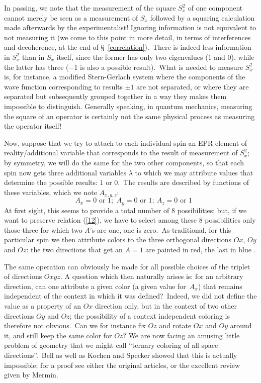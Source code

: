 \documentclass[12pt,onecolumn]{article}%
\begin{document}
In passing, we note that the measurement of the square $S_{x}^{2}$ of one
component cannot merely be seen as a measurement of $S_{x}$ followed by a
squaring calculation made afterwards by the experimentalist! Ignoring
information is not equivalent to not measuring it (we come to this point in
more detail, in terms of interferences and decoherence, at the end of
\S \ \ref{correlation}).\ There is indeed less information in $S_{x}^{2}$ than
in $S_{x}$ itself, since the former has only two eigenvalues ($1$ and $0$),
while the latter has three ($-1$ is also a possible result).\ What is needed
to measure $S_{x}^{2}$ is, for instance, a modified Stern-Gerlach system where
the components of the wave function corresponding to results $\pm1$ are not
separated, or where they are separated but subsequently grouped together in a
way they makes them impossible to distinguish. Generally speaking, in quantum
mechanics, measuring the square of an operator is certainly not the same
physical process as measuring the operator itself!

Now, suppose that we try to attach to each individual spin an EPR element of
reality/additional variable that corresponds to the result of measurement of
$S_{x}^{2}$; by symmetry, we will do the same for the two other components, so
that each spin now gets three additional variables $\lambda$ to which we may
attribute values that determine the possible results: $1$ or $0$.\ The results
are described by functions of these variables, which we note $A_{x,y,z}$:%
\begin{equation}
\text{ \ }\,A_{x}=0\text{\ or }1\text{;\ }\,A_{y}=0\text{\ or }1\text{;}%
\,\ A_{z}=0\text{\ or }1 \label{13}%
\end{equation}
At first sight, this seems to provide a total number of 8 possibilities; but,
if we want to preserve relation (\ref{12}), we have to select among these 8
possibilities only those three for which two $A$'s are one, one is zero.\ As
traditional, for this particular spin we then attribute colors to the three
orthogonal directions $Ox$, $Oy$ and $Oz$: the two directions that get an
$A=1$ are painted in red, the last in blue \cite{Belifante}.

The same operation can obviously be made for all possible choices of the
triplet of directions $Oxyz$. A question which then naturally arises is: for
an arbitrary direction, can one attribute a given color (a given value for
$\,A_{x}$) that remains independent of the context in which it was
defined?\ Indeed, we did not define the value as a property of an $Ox$
direction only, but in the context of two other directions $Oy$ and $Oz$; the
possibility of a context independent coloring is therefore not obvious.\ Can
we for instance fix $Oz$ and rotate $Ox$ and $Oy$ around it, and still keep
the same color for $Oz$? We are now facing an amusing little problem of
geometry that we might call ``ternary coloring of all space
directions''.\ Bell as well as Kochen and Specker showed that this is actually
impossible; for a proof see either the original articles, or the excellent
review \cite{Mermin} given by Mermin.
\end{document}
